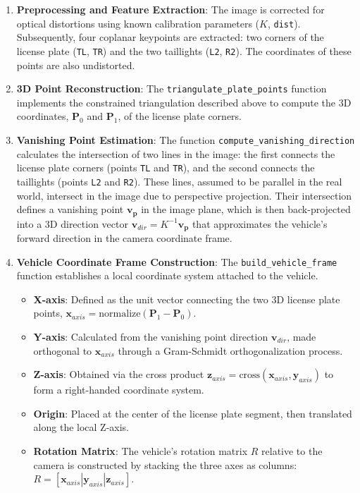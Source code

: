 \begin{enumerate}
    \item \textbf{Preprocessing and Feature Extraction}: The image is corrected for optical distortions using known calibration parameters ($K$, \texttt{dist}). Subsequently, four coplanar keypoints are extracted: two corners of the license plate (\texttt{TL}, \texttt{TR}) and the two taillights (\texttt{L2}, \texttt{R2}). The coordinates of these points are also undistorted.

    \item \textbf{3D Point Reconstruction}: The \texttt{triangulate\_plate\_points} function implements the constrained triangulation described above to compute the 3D coordinates, $\mathbf{P}_0$ and $\mathbf{P}_1$, of the license plate corners.

    \item \textbf{Vanishing Point Estimation}: The function \texttt{compute\_vanishing\_direction} calculates the intersection of two lines in the image: the first connects the license plate corners (points \texttt{TL} and \texttt{TR}), and the second connects the taillights (points \texttt{L2} and \texttt{R2}). These lines, assumed to be parallel in the real world, intersect in the image due to perspective projection. Their intersection defines a vanishing point $\mathbf{v_p}$ in the image plane, which is then back-projected into a 3D direction vector $\mathbf{v}_{dir} = K^{-1} \mathbf{v_p}$ that approximates the vehicle's forward direction in the camera coordinate frame.

    \item \textbf{Vehicle Coordinate Frame Construction}: The \texttt{build\_vehicle\_frame} function establishes a local coordinate system attached to the vehicle.
    
    \begin{itemize}
        \item \textbf{X-axis}: Defined as the unit vector connecting the two 3D license plate points, $\mathbf{x}_{axis} = \text{normalize}(\mathbf{P}_1 - \mathbf{P}_0)$.
        \item \textbf{Y-axis}: Calculated from the vanishing point direction $\mathbf{v}_{dir}$, made orthogonal to $\mathbf{x}_{axis}$ through a Gram-Schmidt orthogonalization process.
        \item \textbf{Z-axis}: Obtained via the cross product $\mathbf{z}_{axis} = \text{cross}(\mathbf{x}_{axis}, \mathbf{y}_{axis})$ to form a right-handed coordinate system.
        \item \textbf{Origin}: Placed at the center of the license plate segment, then translated along the local Z-axis.
        \item \textbf{Rotation Matrix}: The vehicle's rotation matrix $R$ relative to the camera is constructed by stacking the three axes as columns: $R = [\mathbf{x}_{axis} | \mathbf{y}_{axis} | \mathbf{z}_{axis}]$.
    \end{itemize}


\end{enumerate}
